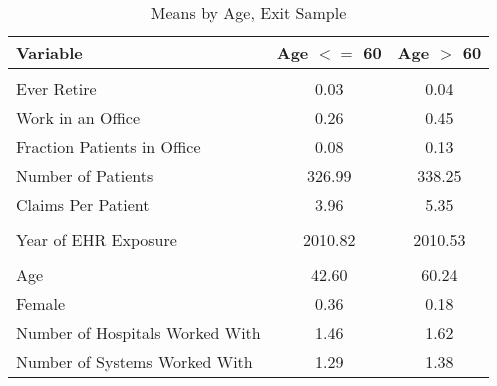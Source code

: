 \begin{table}[h]
\small
\caption{Means by Age, Exit Sample}
\centering
\begin{tabular}[t]{lcc}
\toprule
Variable & Age $<=$ 60 & Age $>$ 60\\
\midrule
\addlinespace[0.3em]
\multicolumn{3}{l}{\textbf{Outcomes}}\\
\hspace{1em}Ever Retire & 0.03 & 0.04\\
\hspace{1em}Work in an Office & 0.26 & 0.45\\
\hspace{1em}Fraction Patients in Office & 0.08 & 0.13\\
\hspace{1em}Number of Patients & 326.99 & 338.25\\
\hspace{1em}Claims Per Patient & 3.96 & 5.35\\
\addlinespace[0.3em]
\multicolumn{3}{l}{\textbf{Treatment}}\\
\hspace{1em}Year of EHR Exposure & 2010.82 & 2010.53\\
\addlinespace[0.3em]
\multicolumn{3}{l}{\textbf{Characteristics}}\\
\hspace{1em}Age & 42.60 & 60.24\\
\hspace{1em}Female & 0.36 & 0.18\\
\hspace{1em}Number of Hospitals Worked With & 1.46 & 1.62\\
\hspace{1em}Number of Systems Worked With & 1.29 & 1.38\\
\bottomrule
\end{tabular}
\end{table}
